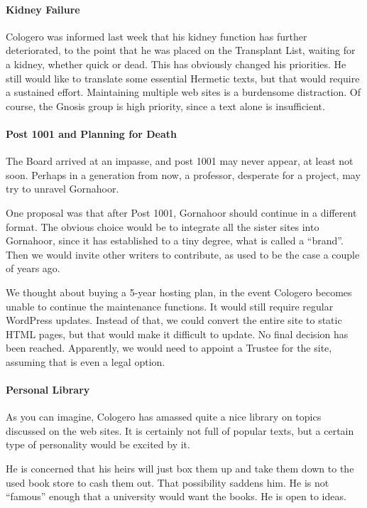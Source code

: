 \paragraph{Kidney Failure}


Cologero was informed last week that his kidney function has further deteriorated, to the point that he was placed on the Transplant List, waiting for a kidney, whether quick or dead. This has obviously changed his priorities. He still would like to translate some essential Hermetic texts, but that would require a sustained effort. Maintaining multiple web sites is a burdensome distraction. Of course, the Gnosis group is high priority, since a text alone is insufficient.

\paragraph{Post 1001 and Planning for Death}


The Board arrived at an impasse, and post 1001 may never appear, at least not soon. Perhaps in a generation from now, a professor, desperate for a project, may try to unravel Gornahoor.

One proposal was that after Post 1001, Gornahoor should continue in a different format. The obvious choice would be to integrate all the sister sites into Gornahoor, since it has established to a tiny degree, what is called a ``brand''. Then we would invite other writers to contribute, as used to be the case a couple of years ago.

We thought about buying a 5-year hosting plan, in the event Cologero becomes unable to continue the maintenance functions. It would still require regular WordPress updates. Instead of that, we could convert the entire site to static HTML pages, but that would make it difficult to update. No final decision has been reached. Apparently, we would need to appoint a Trustee for the site, assuming that is even a legal option.

\paragraph{Personal Library}


As you can imagine, Cologero has amassed quite a nice library on topics discussed on the web sites. It is certainly not full of popular texts, but a certain type of personality would be excited by it.

He is concerned that his heirs will just box them up and take them down to the used book store to cash them out. That possibility saddens him. He is not ``famous'' enough that a university would want the books. He is open to ideas.

